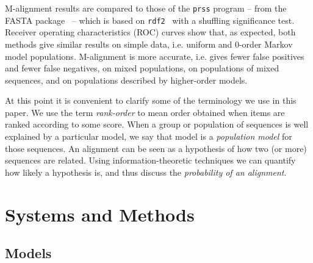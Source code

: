 \documentclass[letterpaper,11pt,oneside]{article}
\begin{document}
\begin{multicols}{2}
M-alignment results are compared to those of
the {\tt prss} program -- from the FASTA package~\cite{pearson96} -- which
is based on {\tt rdf2}~\cite{pearson88} with a shuffling significance test.
Receiver operating characteristics (ROC) curves show that, as expected,
both methods give similar results
on simple data, i.e. uniform and 0-order Markov model populations.
M-alignment is more accurate,
i.e. gives fewer false positives and fewer false negatives,
on mixed populations,
on populations of mixed sequences, and
on populations described by higher-order models.

At this point it is convenient to clarify some of the terminology we use in
this paper.  We use the term {\em rank-order} to mean order obtained when
items are ranked according to some score.  When a group or population of
sequences is well explained by a particular model, we say that model is a
{\em population model} for those sequences.  An alignment can be seen as a
hypothesis of how two (or more) sequences are related.  Using
information-theoretic techniques we can quantify how likely a hypothesis is,
and thus discuss the {\em probability of an alignment}.

\section{Systems and Methods} \label{sec:sys}

\subsection{Models} \label{sec:models}


\end{multicols}
\end{document}

